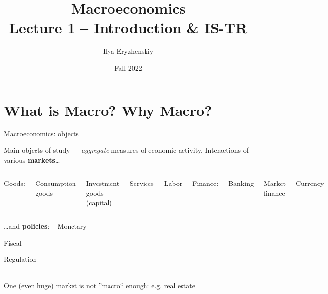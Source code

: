 \documentclass{beamer}
\title[PSME]{Macroeconomics\\ Lecture 1 -- Introduction \& IS-TR }
\author[I. Eryzhenskiy]{Ilya Eryzhenskiy}
\institute[BdF]{PSME Panth\'{e}on-Sorbonne Master in Economics}
\date[PSME macro]{Fall 2022}
\newenvironment{mytemize}
{\vfill\itemize[nolistsep,itemsep=\fill,label=\color{blue}{$\triangleright$}]}
  {\enditemize}
\newcommand{\hitem}[1]{
  {\color{blue}{$\triangleright$}} 
  {#1} 
  {\hfill}
}
\begin{document}
\begin{frame}
\maketitle
\end{frame}

\section{What is Macro? Why Macro?}

\begin{frame}{%
\protect\hypertarget{macroeconomics-object-of-study}{%
Macroeconomics: objects}}

Main objects of study --- \emph{aggregate} measures of economic activity.
\vfill
Interactions of various \textbf{markets}\ldots{}
\vfill
\begin{columns}[c]
  \begin{mytemize}
\item
  Goods:

  \begin{mytemize}
  \item
    Consumption goods
  \item
    Investment goods (capital)
  \end{mytemize}
\item
  Services
  \end{mytemize}
\begin{mytemize}
 
\item
  Labor
\item
  Finance:

  \begin{mytemize}
   
  \item
    Banking
  \item
    Market finance
  \end{mytemize}
\item
  Currency
\end{mytemize}

\end{columns}
\vfill
\ldots{}and \textbf{policies}: 
\vfill
\ 
\hitem{Monetary}
\hitem{Fiscal}
\hitem{Regulation}
\\
\vfill
One (even huge) market is not ''macro`` enough: e.g. real estate

\end{frame}
\end{document}
